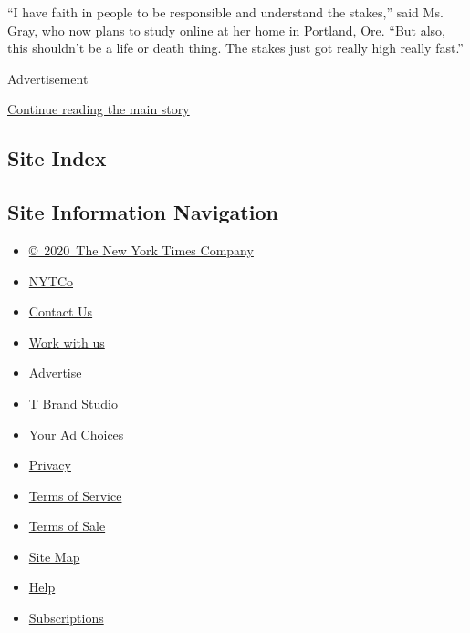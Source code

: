 ``I have faith in people to be responsible and understand the stakes,''
said Ms. Gray, who now plans to study online at her home in Portland,
Ore. ``But also, this shouldn't be a life or death thing. The stakes
just got really high really fast.''

Advertisement

\protect\hyperlink{after-bottom}{Continue reading the main story}

\hypertarget{site-index}{%
\subsection{Site Index}\label{site-index}}

\hypertarget{site-information-navigation}{%
\subsection{Site Information
Navigation}\label{site-information-navigation}}

\begin{itemize}
\tightlist
\item
  \href{https://help.nytimes.com/hc/en-us/articles/115014792127-Copyright-notice}{©~2020~The
  New York Times Company}
\end{itemize}

\begin{itemize}
\tightlist
\item
  \href{https://www.nytco.com/}{NYTCo}
\item
  \href{https://help.nytimes.com/hc/en-us/articles/115015385887-Contact-Us}{Contact
  Us}
\item
  \href{https://www.nytco.com/careers/}{Work with us}
\item
  \href{https://nytmediakit.com/}{Advertise}
\item
  \href{http://www.tbrandstudio.com/}{T Brand Studio}
\item
  \href{https://www.nytimes.com/privacy/cookie-policy\#how-do-i-manage-trackers}{Your
  Ad Choices}
\item
  \href{https://www.nytimes.com/privacy}{Privacy}
\item
  \href{https://help.nytimes.com/hc/en-us/articles/115014893428-Terms-of-service}{Terms
  of Service}
\item
  \href{https://help.nytimes.com/hc/en-us/articles/115014893968-Terms-of-sale}{Terms
  of Sale}
\item
  \href{https://spiderbites.nytimes.com}{Site Map}
\item
  \href{https://help.nytimes.com/hc/en-us}{Help}
\item
  \href{https://www.nytimes.com/subscription?campaignId=37WXW}{Subscriptions}
\end{itemize}
